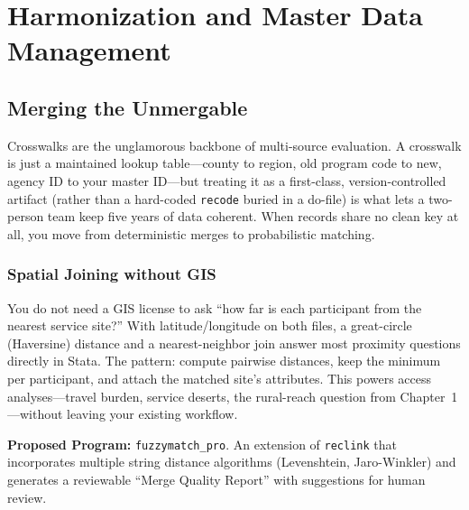 \documentclass[
    a4paper,
    fontsize=10pt,
    twoside=true,
    numbers=noenddot,
]{kaobook}
\providecommand{\Environment}[1]{\texttt{#1}}
\begin{document}
\chapter{Harmonization and Master Data Management}
\section{Merging the Unmergable}
Crosswalks are the unglamorous backbone of multi-source evaluation. A crosswalk is just a maintained lookup table---county to region, old program code to new, agency ID to your master ID---but treating it as a first-class, version-controlled artifact (rather than a hard-coded \texttt{recode} buried in a do-file) is what lets a two-person team keep five years of data coherent. When records share no clean key at all, you move from deterministic merges to probabilistic matching.

\subsection{Spatial Joining without GIS}
You do not need a GIS license to ask \enquote{how far is each participant from the nearest service site?} With latitude/longitude on both files, a great-circle (Haversine) distance and a nearest-neighbor join answer most proximity questions directly in Stata. The pattern: compute pairwise distances, keep the minimum per participant, and attach the matched site's attributes. This powers access analyses---travel burden, service deserts, the rural-reach question from Chapter~1---without leaving your existing workflow.

\begin{kaobox}[frametitle=Ado-file Idea: \texttt{fuzzymatch\_pro}]
\textbf{Proposed Program:} \texttt{fuzzymatch\_pro}. An extension of \Environment{reclink} that incorporates multiple string distance algorithms (Levenshtein, Jaro-Winkler) and generates a reviewable \enquote{Merge Quality Report} with suggestions for human review.
\end{kaobox}
\end{document}
